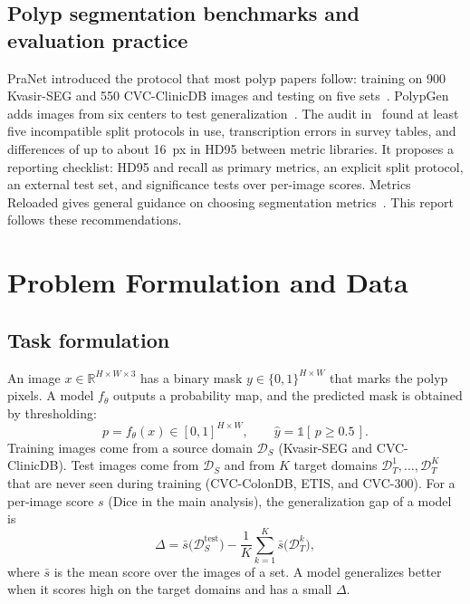 \documentclass[10pt,twoside]{article}
\begin{document}
\subsection{Polyp segmentation benchmarks and evaluation practice}
PraNet introduced the protocol that most polyp papers follow: training on 900
Kvasir-SEG and 550 CVC-ClinicDB images and testing on five
sets~\cite{fan2020pranet}. PolypGen adds images from six centers to test
generalization~\cite{ali2023polypgen}. The audit in~\cite{urooj2026audit} found at
least five incompatible split protocols in use, transcription errors in survey
tables, and differences of up to about 16~px in HD95 between metric libraries. It
proposes a reporting checklist: HD95 and recall as primary metrics, an explicit split
protocol, an external test set, and significance tests over per-image scores. Metrics
Reloaded gives general guidance on choosing segmentation
metrics~\cite{maierhein2024metrics}. This report follows these recommendations.

\section{Problem Formulation and Data}\label{sec:problem}
\subsection{Task formulation}
An image $x\in\mathbb{R}^{H\times W\times 3}$ has a binary mask
$y\in\{0,1\}^{H\times W}$ that marks the polyp pixels. A model $f_\theta$ outputs a
probability map, and the predicted mask is obtained by thresholding:
\begin{equation}
  p = f_\theta(x)\in[0,1]^{H\times W},\qquad \hat{y} = \mathbb{1}[\,p \ge 0.5\,].
\end{equation}
Training images come from a source domain $\mathcal{D}_S$ (Kvasir-SEG and
CVC-ClinicDB). Test images come from $\mathcal{D}_S$ and from $K$ target domains
$\mathcal{D}_T^1,\dots,\mathcal{D}_T^K$ that are never seen during training
(CVC-ColonDB, ETIS, and CVC-300). For a per-image score $s$ (Dice in the main
analysis), the generalization gap of a model is
\begin{equation}\label{eq:gap}
  \Delta = \bar{s}\bigl(\mathcal{D}_S^{\text{test}}\bigr)
  - \frac{1}{K}\sum_{k=1}^{K}\bar{s}\bigl(\mathcal{D}_T^{k}\bigr),
\end{equation}
where $\bar{s}$ is the mean score over the images of a set. A model generalizes
better when it scores high on the target domains and has a small $\Delta$.
\end{document}
